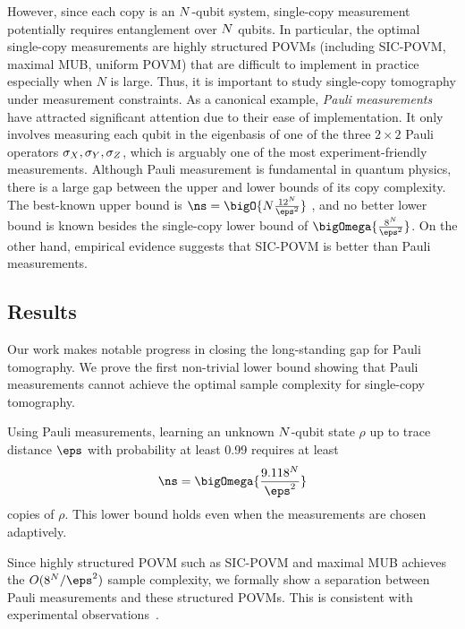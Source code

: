 However, since each copy is an ${N}$-qubit system, single-copy measurement potentially requires entanglement over ${N}$ qubits. 
In particular, the optimal single-copy measurements \cite{KRT14,guctua2020fast} are highly structured POVMs (including SIC-POVM, maximal MUB, uniform POVM) that are difficult to implement in practice especially when $N$ is large.
Thus, it is important to study single-copy tomography under measurement constraints. 
As a canonical example, \emph{Pauli measurements} have attracted significant attention due to their ease of implementation. 
It only involves measuring each qubit in the eigenbasis of one of the three $2\times 2$ Pauli operators ${\sigma_X},{\sigma_Y},{\sigma_Z}$, which is arguably one of the most experiment-friendly measurements. 
Although Pauli measurement is fundamental in quantum physics, there is a large gap between the upper and lower bounds of its copy complexity. 
The best-known upper bound is $\ns=\bigO{\nqubits\frac{12^{\nqubits}}{\eps^2}}$ \cite{guctua2020fast}, and no better lower bound is known besides the single-copy lower bound of $\bigOmega{\frac
{8^{\nqubits}}{\eps^2}}$. On the other hand, empirical evidence \cite{stricker2022pauliSIC} suggests that SIC-POVM is better than Pauli measurements.







\subsection{Results}
Our work makes notable progress in closing the long-standing gap for Pauli tomography.
We prove the first non-trivial lower bound showing that Pauli measurements cannot achieve the optimal sample complexity for single-copy tomography.  
\begin{theorem}
Using Pauli measurements, learning an unknown ${N}$-qubit state $\rho$ up to trace distance $\eps$  with probability at least 0.99 requires at least
\[
\ns = \bigOmega{\frac{9.118^{\nqubits}}{\eps^2}}
\]
copies of $\rho$.
This lower bound holds even when the measurements are chosen adaptively.
\label{thm:pauli-lower}
\end{theorem}
Since highly structured POVM such as SIC-POVM and maximal MUB achieves the $O(8^{\nqubits}/\eps^2)$ sample complexity, we formally show a separation between Pauli measurements and these structured POVMs. This is consistent with experimental observations~\cite{stricker2022pauliSIC}.

